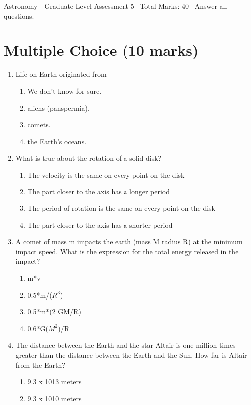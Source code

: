 \documentclass[12pt]{article}
\begin{document}
\begin{center}
Astronomy - Graduate Level Assessment 5 \
Total Marks: 40 \
Answer all questions.
\end{center}

\section*{Multiple Choice (10 marks)}
\begin{enumerate}[label=\arabic*.]
\item Life on Earth originated from
\begin{enumerate}[label=(\alph*)]
    \item We don't know for sure.
    \item aliens (panspermia).
    \item comets.
    \item the Earth's oceans.
\end{enumerate}
\item What is true about the rotation of a solid disk?
\begin{enumerate}[label=(\alph*)]
    \item The velocity is the same on every point on the disk
    \item The part closer to the axis has a longer period
    \item The period of rotation is the same on every point on the disk
    \item The part closer to the axis has a shorter period
\end{enumerate}
\item A comet of mass m impacts the earth (mass M radius R) at the minimum impact speed. What is the expression for the total energy released in the impact?
\begin{enumerate}[label=(\alph*)]
    \item m*v
    \item 0.5*m/($R^3$)
    \item 0.5*m*(2 GM/R)
    \item 0.6*G($M^2$)/R
\end{enumerate}
\item The distance between the Earth and the star Altair is one million times greater than the distance between the Earth and the Sun. How far is Altair from the Earth?
\begin{enumerate}[label=(\alph*)]
    \item 9.3 x 1013 meters
    \item 9.3 x 1010 meters

\end{enumerate}
\end{enumerate}
\end{document}
